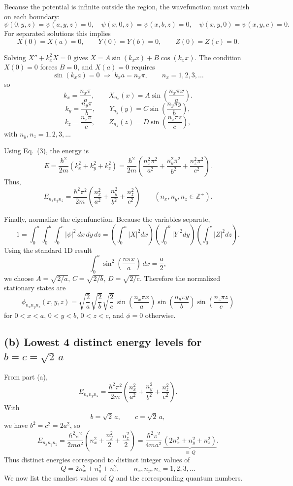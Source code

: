 \documentclass{article}
\begin{document}
Because the potential is infinite outside the region, the wavefunction must vanish
on each boundary:
\[
\psi(0,y,z)=\psi(a,y,z)=0,\quad
\psi(x,0,z)=\psi(x,b,z)=0,\quad
\psi(x,y,0)=\psi(x,y,c)=0.
\]
For separated solutions this implies
\[
X(0)=X(a)=0,\qquad Y(0)=Y(b)=0,\qquad Z(0)=Z(c)=0.
\tag{5}
\]

Solving $X''+k_x^2X=0$ gives $X=A\sin(k_x x)+B\cos(k_x x)$.
The condition $X(0)=0$ forces $B=0$, and $X(a)=0$ requires
\[
\sin(k_x a)=0 \;\Rightarrow\; k_x a = n_x\pi,\qquad n_x=1,2,3,\dots
\]
so
\[
k_x=\frac{n_x\pi}{a},\qquad X_{n_x}(x)=A\sin\!\left(\frac{n_x\pi x}{a}\right).
\]
\[
k_y=\frac{n_y\pi}{b},\qquad Y_{n_y}(y)=C\sin\!\left(\frac{n_y\pi y}{b}\right),
\]
\[
k_z=\frac{n_z\pi}{c},\qquad Z_{n_z}(z)=D\sin\!\left(\frac{n_z\pi z}{c}\right),
\]
with $n_y,n_z=1,2,3,\dots$

Using Eq.~(3), the energy is
\[
E=\frac{\hbar^2}{2m}\left(k_x^2+k_y^2+k_z^2\right)
=\frac{\hbar^2}{2m}\left(\frac{n_x^2\pi^2}{a^2}+\frac{n_y^2\pi^2}{b^2}+\frac{n_z^2\pi^2}{c^2}\right).
\]
Thus,
\[
\boxed{
E_{n_x n_y n_z}
=
\frac{\hbar^2\pi^2}{2m}
\left(
\frac{n_x^2}{a^2}+\frac{n_y^2}{b^2}+\frac{n_z^2}{c^2}
\right)
}
\qquad (n_x,n_y,n_z\in\mathbb{Z}^+).
\]

Finally, normalize the eigenfunction.  Because the variables separate,
\[
1=\int_0^a\int_0^b\int_0^c |\psi|^2\,dx\,dy\,dz
=\left(\int_0^a |X|^2dx\right)\left(\int_0^b |Y|^2dy\right)\left(\int_0^c |Z|^2dz\right).
\]
Using the standard 1D result
\[
\int_0^a \sin^2\!\left(\frac{n\pi x}{a}\right)\,dx=\frac{a}{2},
\]
we choose $A=\sqrt{2/a}$, $C=\sqrt{2/b}$, $D=\sqrt{2/c}$. Therefore the normalized
stationary states are
\[
\boxed{
\phi_{n_x n_y n_z}(x,y,z)
=
\sqrt{\frac{2}{a}}\sqrt{\frac{2}{b}}\sqrt{\frac{2}{c}}\,
\sin\!\left(\frac{n_x\pi x}{a}\right)
\sin\!\left(\frac{n_y\pi y}{b}\right)
\sin\!\left(\frac{n_z\pi z}{c}\right)
}
\]
for $0<x<a$, $0<y<b$, $0<z<c$, and $\phi=0$ otherwise.

\subsection*{(b) Lowest 4 distinct energy levels for $b=c=\sqrt{2}\,a$}

From part (a),
\[
E_{n_x n_y n_z}
=
\frac{\hbar^2\pi^2}{2m}
\left(
\frac{n_x^2}{a^2}+\frac{n_y^2}{b^2}+\frac{n_z^2}{c^2}
\right).
\]
With
\[
b=\sqrt{2}\,a,\qquad c=\sqrt{2}\,a,
\]
we have $b^2=c^2=2a^2$, so
\[
E_{n_x n_y n_z}
=
\frac{\hbar^2\pi^2}{2m a^2}
\left(
n_x^2+\frac{n_y^2}{2}+\frac{n_z^2}{2}
\right)
=
\frac{\hbar^2\pi^2}{4m a^2}\,
\underbrace{\left(2n_x^2+n_y^2+n_z^2\right)}_{\equiv\,Q}.
\tag{6}
\]
Thus distinct energies correspond to distinct integer values of
\[
Q=2n_x^2+n_y^2+n_z^2,\qquad n_x,n_y,n_z=1,2,3,\dots
\]
We now list the smallest values of $Q$ and the corresponding quantum numbers.
\end{document}
